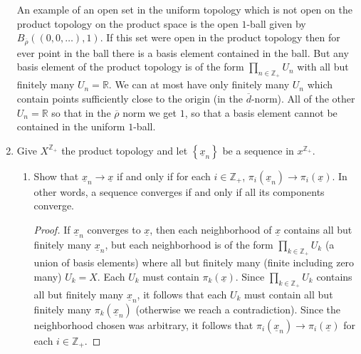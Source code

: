 \documentclass[11pt]{article}
\newcommand{\cbr}[1]{\left\{#1\right\}}
\begin{document}
\begin{enumerate}
    An example of an open set in the uniform topology which is not open on the product topology on the product space is the open $1$-ball given by $B_{\overline{\rho}}((0,0,\dots), 1)$. If this set were open in the product topology then for ever point in the ball there is a basis element contained in the ball. But any basis element of the product topology is of the form $\prod_{n\in\mathbb{Z}_+}U_n$ with all but finitely many $U_n = \mathbb{R}$. We can at most have only finitely many $U_n$ which contain points sufficiently close to the origin (in the $\overline{d}$-norm). All of the other $U_n = \mathbb{R}$ so that in the $\overline{\rho}$ norm we get $1$, so that a basis element cannot be contained in the uniform $1$-ball.
    \item Give $X^{\mathbb{Z}_+}$ the product topology and let $\cbr{\underline{x}_n}$ be a sequence in $x^{\mathbb{Z}_+}$.\begin{enumerate}[label=(\alph*)]
      \item Show that $\underline{x}_n\to \underline{x}$ if and only if for each $i\in\mathbb{Z}_+$, $\pi_i(\underline{x}_n)\to\pi_i(\underline{x})$. In other words, a sequence converges if and only if all its components converge.
      \begin{proof}
        If $\underline{x}_n$ converges to $\underline{x}$, then each neighborhood of $\underline{x}$ contains all but finitely many $\underline{x}_n$, but each neighborhood is of the form $\prod_{k\in\mathbb{Z}_+}U_k$ (a union of basis elements) where all but finitely many (finite including zero many) $U_k = X$. Each $U_k$ must contain $\pi_k(\underline{x})$. Since $\prod_{k\in\mathbb{Z}_+}U_k$ contains all but finitely many $\underline{x}_n$, it follows that each $U_k$ must contain all but finitely many $\pi_k(\underline{x}_n)$ (otherwise we reach a contradiction). Since the neighborhood chosen was arbitrary, it follows that $\pi_i(\underline{x}_n)\to \pi_i(\underline{x})$ for each $i\in\mathbb{Z}_+$.


\end{proof}
\end{enumerate}
\end{enumerate}
\end{document}
